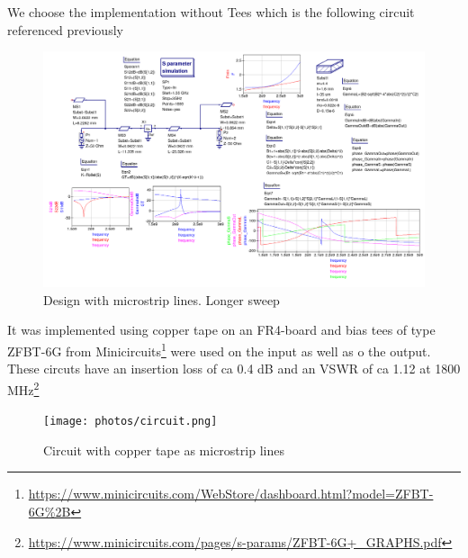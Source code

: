 \documentclass{article}
\begin{document}
We choose the implementation without Tees which is the following circuit
referenced previously
\begin{figure}[H]
\centering
  \includegraphics[width=\linewidth]{X1800MHzAt13dBAt2dBNFSweep.png}
  \caption{Design with microstrip lines. Longer sweep}
  \label{fig4}
\end{figure}

It was implemented using copper tape on an FR4-board and bias tees of type ZFBT-6G
from Minicircuits\footnote{\url{https://www.minicircuits.com/WebStore/dashboard.html?model=ZFBT-6G\%2B}} were used on the 
input as well as o the output. These circuts have an insertion loss of ca 0.4 dB and an VSWR of ca 1.12
at 1800 MHz\footnote{\url{https://www.minicircuits.com/pages/s-params/ZFBT-6G+_GRAPHS.pdf}}

\begin{figure}[H]
\centering
  \texttt{[image: photos/circuit.png]}
  \caption{Circuit with copper tape as microstrip lines}
  \label{fig4}
\end{figure}
\end{document}
